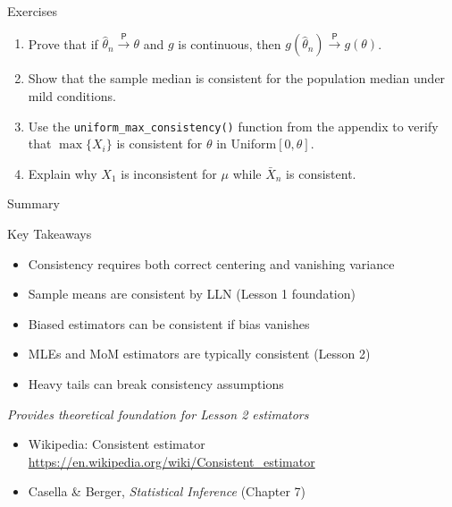 \begin{frame}{Exercises}
  \begin{enumerate}
    \item Prove that if $\hat{\theta}_n \xrightarrow{\;\mathsf{P}\;} \theta$ and $g$ is continuous, then $g(\hat{\theta}_n) \xrightarrow{\;\mathsf{P}\;} g(\theta)$.
    \item Show that the sample median is consistent for the population median under mild conditions.
    \item Use the \texttt{uniform\_max\_consistency()} function from the appendix to verify that $\max\{X_i\}$ is consistent for $\theta$ in Uniform$[0,\theta]$.
    \item Explain why $X_1$ is inconsistent for $\mu$ while $\bar{X}_n$ is consistent.
  \end{enumerate}
\end{frame}

\begin{frame}{Summary}
  \begin{block}{Key Takeaways}
    \begin{itemize}
      \item Consistency requires both correct centering and vanishing variance
      \item Sample means are consistent by LLN (Lesson 1 foundation)
      \item Biased estimators can be consistent if bias vanishes
      \item MLEs and MoM estimators are typically consistent (Lesson 2)
      \item Heavy tails can break consistency assumptions
    \end{itemize}
  \end{block}

  \begin{center}
    \textit{Provides theoretical foundation for Lesson 2 estimators}
  \end{center}

  \footnotesize
  \begin{itemize}
    \item Wikipedia: Consistent estimator \url{https://en.wikipedia.org/wiki/Consistent_estimator}
    \item Casella \& Berger, \textit{Statistical Inference} (Chapter 7)
  \end{itemize}
\end{frame}
